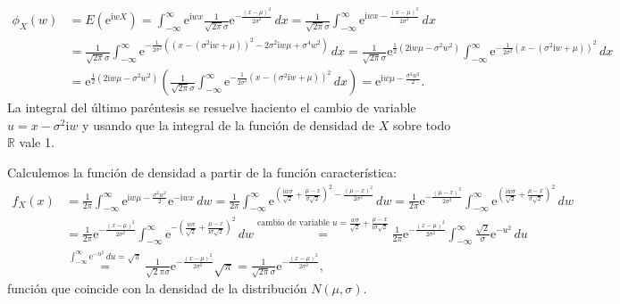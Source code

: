 \documentclass[]{book}
\begin{document}
\[
\begin{array}{rl}
\phi_X (w) & =E\left(\mathrm{e}^{\mathrm{i}w X}\right)=\int_{-\infty}^\infty \mathrm{e}^{\mathrm{i}w x}\frac{1}{\sqrt{2\pi}\sigma}\mathrm{e}^{-\frac{(x-\mu)^2}{2\sigma^2}}\, dx = \frac{1}{\sqrt{2\pi}\sigma} \int_{-\infty}^\infty \mathrm{e}^{\mathrm{i}wx-\frac{(x-\mu)^2}{2\sigma^2}}\, dx \\  & =  \frac{1}{\sqrt{2\pi}\sigma} \int_{-\infty}^\infty \mathrm{e}^{-\frac{1}{2\sigma^2}\left((x-(\sigma^2 \mathrm{i}w+\mu))^2-2\sigma^2 \mathrm{i}w \mu+\sigma^4 w^2\right)}\, dx = \frac{1}{\sqrt{2\pi}\sigma} \mathrm{e}^{\frac{1}{2}(2 \mathrm{i}w \mu -\sigma^2 w^2)}\int_{-\infty}^\infty \mathrm{e}^{-\frac{1}{2\sigma^2}(x-(\sigma^2 \mathrm{i}w+\mu))^2}\, dx\\ &  = \mathrm{e}^{\frac{1}{2}(2 \mathrm{i}w \mu -\sigma^2 w^2)} \left( \frac{1}{\sqrt{2\pi}\sigma} \int_{-\infty}^\infty \mathrm{e}^{-\frac{1}{2\sigma^2}(x-(\sigma^2 \mathrm{i}w+\mu))^2}\, dx\right) =  \mathrm{e}^{ \mathrm{i}w \mu -\frac{\sigma^2 w^2}{2}}.
\end{array}
\]
La integral del último paréntesis se resuelve haciento el cambio de variable \(u=x-\sigma^2 \mathrm{i}w\) y usando que la integral de la función de densidad de \(X\) sobre todo \(\mathbb{R}\) vale 1.

Calculemos la función de densidad a partir de la función característica:
\[
\begin{array}{rl}
f_X(x) & =\frac{1}{2\pi}\int_{-\infty}^\infty \mathrm{e}^{ \mathrm{i}w \mu -\frac{\sigma^2 w^2}{2}}\mathrm{e}^{-\mathrm{i} w x}\, dw = \frac{1}{2\pi}\int_{-\infty}^\infty \mathrm{e}^{\left(\frac{\mathrm{i}w\sigma}{\sqrt{2}}+\frac{\mu-x}{\sigma\sqrt{2}}\right)^2-\frac{(\mu-x)^2}{2\sigma^2}}\, dw =\frac{1}{2\pi}\mathrm{e}^{-\frac{(\mu-x)^2}{2\sigma^2}}\int_{-\infty}^\infty \mathrm{e}^{\left(\frac{\mathrm{i}w\sigma}{\sqrt{2}}+\frac{\mu-x}{\sigma\sqrt{2}}\right)^2}\, dw \\ & = \frac{1}{2\pi}\mathrm{e}^{-\frac{(x-\mu)^2}{2\sigma^2}}\int_{-\infty}^\infty \mathrm{e}^{-\left(\frac{w\sigma}{\sqrt{2}}+\frac{\mu-x}{\mathrm{i}\sigma\sqrt{2}}\right)^2}\, dw \stackrel{\mbox{cambio de variable } u=\frac{w\sigma}{\sqrt{2}}+\frac{\mu-x}{\mathrm{i}\sigma\sqrt{2}}}{=} \frac{1}{2\pi}\mathrm{e}^{-\frac{(x-\mu)^2}{2\sigma^2}}\int_{-\infty}^\infty \frac{\sqrt{2}}{\sigma}\mathrm{e}^{-u^2}\, du \\ & \stackrel{\int_{-\infty}^\infty \mathrm{e}^{-u^2}\, du =\sqrt{\pi}}{=} \frac{1}{\sqrt{2}\pi\sigma} \mathrm{e}^{-\frac{(x-\mu)^2}{2\sigma^2}} \sqrt{\pi} = \frac{1}{\sqrt{2\pi}\sigma}\mathrm{e}^{-\frac{(x-\mu)^2}{2\sigma^2}},
\end{array}
\]
función que coincide con la densidad de la distribución \(N(\mu,\sigma)\).
\end{document}
